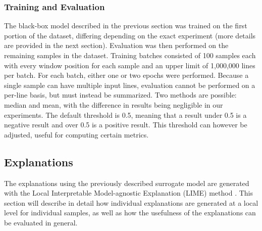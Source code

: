 \documentclass{article}
\begin{document}
			\subsubsection{Training and Evaluation}
			The black-box model described in the previous section was trained on the first portion
			of the dataset, differing depending on the exact experiment (more details are provided
			in the next section). Evaluation was then performed on the remaining samples in the
			dataset. Training batches consisted of 100 samples each with every window position for
			each sample and an upper limit of 1,000,000 lines per batch. For each batch, either
			one or two epochs were performed. Because a single sample can have multiple input
			lines, evaluation cannot be performed on a per-line basis, but must instead be
			summarized. Two methods are possible: median and mean, with the difference in results
			being negligible in our experiments. The default threshold is 0.5, meaning that a
			result under 0.5 is a negative result and over 0.5 is a positive result. This
			threshold can however be adjusted, useful for computing certain metrics.
		\subsection{Explanations}
		The explanations using the previously described surrogate model are generated with the
		Local Interpretable Model-agnostic Explanation (LIME) method \cite{ribeiro_why_2016}. This
		section will describe in detail how individual explanations are generated at a local level
		for individual samples, as well as how the usefulness of the explanations can be evaluated
		in general.
\end{document}
